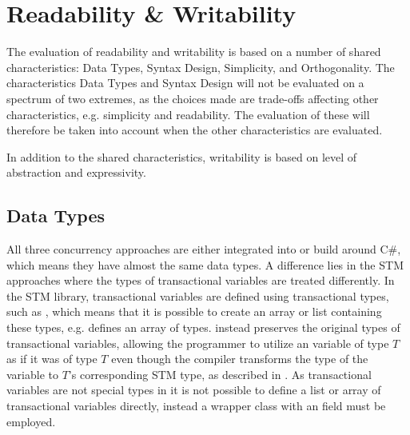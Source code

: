 \section{Readability \& Writability}\label{subsec:tl_charac_read_and_write}
The evaluation of readability and writability is based on a number of shared characteristics: Data Types, Syntax Design, Simplicity, and Orthogonality. The characteristics Data Types and Syntax Design will not be evaluated on a spectrum of two extremes, as the choices made are trade-offs affecting other characteristics, e.g. simplicity and readability. The evaluation of these will therefore be taken into account when the other characteristics are evaluated.

In addition to the shared characteristics, writability is based on level of abstraction and expressivity.
\subsection{Data Types}\label{subsec:datatypes}
All three concurrency approaches are either integrated into or build around C\#, which means they have almost the same data types. A difference lies in the \ac{STM} approaches where the types of transactional variables are treated differently. In the \ac{STM} library, transactional variables are defined using transactional types, such as , which means that it is possible to create an array or list containing these types, e.g.  defines an array of  types. \stmname instead  preserves the original types of transactional variables, allowing the programmer to utilize an  variable of type $T$ as if it was of type $T$ even though the compiler transforms the type of the variable to $T$'s corresponding \ac{STM} type, as described in . As transactional variables are not special types in \stmname it is not possible to define a list or array of transactional variables directly, instead a wrapper class with an  field must be employed.

